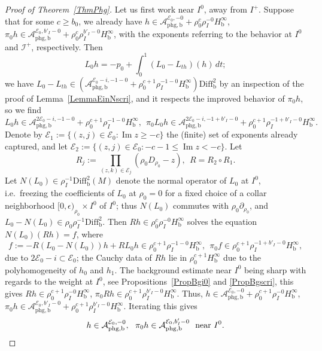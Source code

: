 \documentclass[reqno,11pt,letterpaper]{amsart}
\numberwithin{equation}{section}
\numberwithin{figure}{section}
\theoremstyle{definition}
\theoremstyle{remark}
\newcommand{\mc}{\mathcal}
\newcommand{\cA}{\mc A}
\newcommand{\cE}{\mc E}
\newcommand{\ms}{\mathscr}
\newcommand{\scri}{\ms I}
\renewcommand{\Im}{\operatorname{Im}}
\newcommand{\eps}{\epsilon}
\newcommand{\pa}{\partial}
\newcommand{\tn}{\textnormal}
\newcommand{\bop}{{\mathrm{b}}}
\newcommand{\Diff}{\mathrm{Diff}}
\newcommand{\Diffb}{\Diff_\bop}
\newcommand{\Hb}{H_{\bop}}
\newcommand{\phg}{{\mathrm{phg}}}
\newcommand{\usref}[1]{{\upshape\ref{#1}}}
\begin{document}
\begin{proof}[Proof of Theorem~\usref{ThmPhg}]
  Let us first work near $I^0$, away from $I^+$. Suppose that for some $c\geq b_0$, we already have $h\in\cA_{\phg,\bop}^{\cE_0,-0}+\rho_0^c\rho_I^{-0}\Hb^\infty$, $\pi_0 h\in\cA_{\phg,\bop}^{\cE_0,b'_I-0}+\rho_0^c\rho_I^{b'_I-0}\Hb^\infty$, with the exponents referring to the behavior at $I^0$ and $\scri^+$, respectively. Then
  \begin{equation}
  \label{EqPhgNonlinLin2}
    L_0 h = -p_0 + \int_0^1(L_0-L_{t h})(h)\,d t;
  \end{equation}
  we have $L_0-L_{t h}\in(\cA_{\phg,\bop}^{\cE_0-i,-1-0}+\rho_0^{c+1}\rho_I^{-1-0}\Hb^\infty)\Diffb^2$ by an inspection of the proof of Lemma~\ref{LemmaEinNscri}, and it respects the improved behavior of $\pi_0 h$, so we find
  \[
    L_0 h \in \cA_{\phg,\bop}^{2\cE_0-i,-1-0}+\rho_0^{c+1}\rho_I^{-1-0}\Hb^\infty,\ \ 
    \pi_0 L_0 h \in \cA_{\phg,\bop}^{2\cE_0-i,-1+b'_I-0}+\rho_0^{c+1}\rho_I^{-1+b'_I-0}\Hb^\infty.
  \]
  Denote by $\cE_1:=\{(z,j)\in\cE_0\colon \Im z\geq-c\}$ the (finite) set of exponents already captured, and let $\cE_2:=\{(z,j)\in\cE_0\colon -c-1\leq\Im z<-c\}$. Let
  \[
    R_j := \prod_{(z,k)\in\cE_j} (\rho_0 D_{\rho_0}-z),\ \ 
    R=R_2\circ R_1.
  \]
  Let $N(L_0)\in\rho_I^{-1}\Diffb^2(M)$ denote the normal operator of $L_0$ at $I^0$, i.e.\ freezing the coefficients of $L_0$ at $\rho_0=0$ for a fixed choice of a collar neighborhood $[0,\eps)_{\rho_0}\times I^0$ of $I^0$; thus $N(L_0)$ commutes with $\rho_0\pa_{\rho_0}$, and $L_0-N(L_0)\in\rho_0\rho_I^{-1}\Diffb^2$. Then $R h\in\rho_0^c\rho_I^{-0}\Hb^\infty$ solves the equation $N(L_0)(R h)=f$, where
  \[
    f := -R(L_0-N(L_0))h + R L_0 h \in \rho_0^{c+1}\rho_I^{-1-0}\Hb^\infty,\ \ 
    \pi_0 f\in\rho_0^{c+1}\rho_I^{-1+b'_I-0}\Hb^\infty,
  \]
  due to $2\cE_0-i\subset\cE_0$; the Cauchy data of $R h$ lie in $\rho_0^{c+1}\Hb^\infty$ due to the polyhomogeneity of $h_0$ and $h_1$. The background estimate near $I^0$ being sharp with regards to the weight at $I^0$, see Propositions~\ref{PropBgi0} and \ref{PropBgscri}, this gives $R h\in\rho_0^{c+1}\rho_I^{-0}\Hb^\infty$, $\pi_0 R h\in\rho_0^{c+1}\rho_I^{b'_I-0}\Hb^\infty$. Thus, $h\in\cA_{\phg,\bop}^{\cE_0,-0}+\rho_0^{c+1}\rho_I^{-0}\Hb^\infty$, $\pi_0 h\in\cA_{\phg,\bop}^{\cE_0,b'_I-0}+\rho_0^{c+1}\rho_I^{b'_I-0}\Hb^\infty$. Iterating this gives
  \begin{equation}
  \label{EqPhgi0}
    h\in\cA_{\phg,\bop}^{\cE_0,-0},\ \ 
    \pi_0 h\in\cA_{\phg,\bop}^{\cE_0,b'_I-0}\ \ \tn{near}\ I^0.
  \end{equation}


\end{proof}
\end{document}
